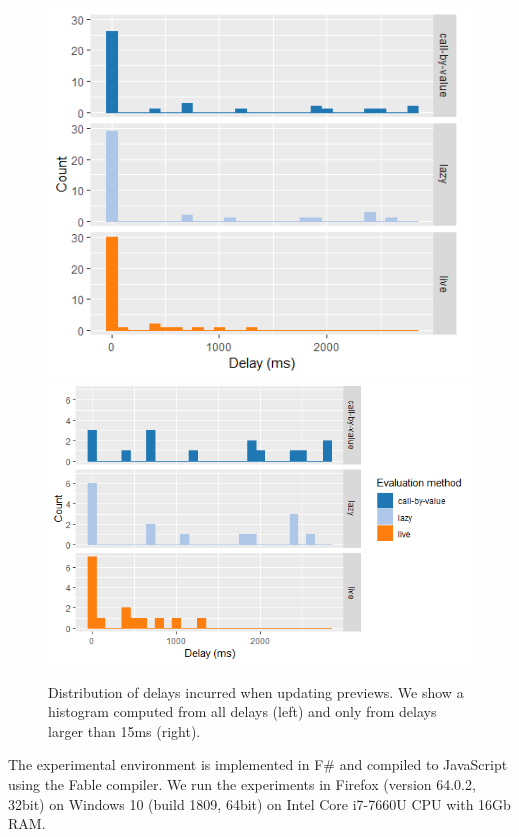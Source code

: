 \documentclass[english,submission]{programming}
\theoremstyle{plain}
\theoremstyle{definition}
\begin{document}
\begin{figure}[b]
\vspace{-0.5em}
\noindent
\includegraphics[scale=0.48]{figures/hist-all.png}
\includegraphics[scale=0.48]{figures/hist-slow.png}
\vspace{-0.25em}
\caption{Distribution of delays incurred when updating previews.
  We show a histogram computed from all delays (left) and only from delays larger
  than 15ms (right).}
\label{fig:drawing-hist}
\vspace{-0.75em}
\end{figure}


The experimental environment is implemented in F\# and compiled to JavaScript using the Fable
compiler. We run the experiments in Firefox (version 64.0.2, 32bit) on Windows 10
(build 1809, 64bit) on Intel Core i7-7660U CPU with 16Gb RAM.
\end{document}
